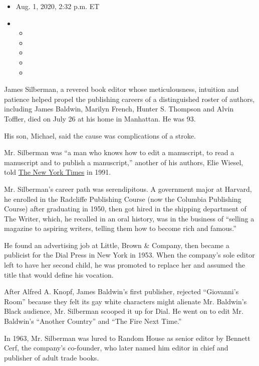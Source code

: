\begin{itemize}
\item
  Aug. 1, 2020, 2:32 p.m. ET
\item
  \begin{itemize}
  \item
  \item
  \item
  \item
  \item
  \end{itemize}
\end{itemize}

James Silberman, a revered book editor whose meticulousness, intuition
and patience helped propel the publishing careers of a distinguished
roster of authors, including James Baldwin, Marilyn French, Hunter S.
Thompson and Alvin Toffler, died on July 26 at his home in Manhattan. He
was 93.

His son, Michael, said the cause was complications of a stroke.

Mr. Silberman was ``a man who knows how to edit a manuscript, to read a
manuscript and to publish a manuscript,'' another of his authors, Elie
Wiesel, told
\href{https://www.nytimes3xbfgragh.onion/1991/10/30/business/the-media-business-head-of-summit-books-is-said-to-be-leaving.html}{The
New York Times} in 1991.

Mr. Silberman's career path was serendipitous. A government major at
Harvard, he enrolled in the Radcliffe Publishing Course (now the
Columbia Publishing Course) after graduating in 1950, then got hired in
the shipping department of The Writer, which, he recalled in an oral
history, was in the business of ``selling a magazine to aspiring
writers, telling them how to become rich and famous.''

He found an advertising job at Little, Brown \& Company, then became a
publicist for the Dial Press in New York in 1953. When the company's
sole editor left to have her second child, he was promoted to replace
her and assumed the title that would define his vocation.

After Alfred A. Knopf, James Baldwin's first publisher, rejected
``Giovanni's Room'' because they felt its gay white characters might
alienate Mr. Baldwin's Black audience, Mr. Silberman scooped it up for
Dial. He went on to edit Mr. Baldwin's ``Another Country'' and ``The
Fire Next Time.''

In 1963, Mr. Silberman was lured to Random House as senior editor by
Bennett Cerf, the company's co-founder, who later named him editor in
chief and publisher of adult trade books.

